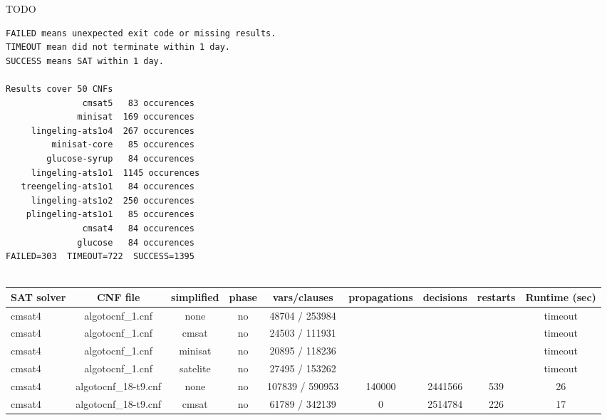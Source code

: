\begin{appendices}
TODO
\begin{verbatim}
FAILED means unexpected exit code or missing results.
TIMEOUT mean did not terminate within 1 day.
SUCCESS means SAT within 1 day.

Results cover 50 CNFs
               cmsat5   83 occurences
              minisat  169 occurences
     lingeling-ats1o4  267 occurences
         minisat-core   85 occurences
        glucose-syrup   84 occurences
     lingeling-ats1o1  1145 occurences
   treengeling-ats1o1   84 occurences
     lingeling-ats1o2  250 occurences
    plingeling-ats1o1   85 occurences
               cmsat4   84 occurences
              glucose   84 occurences
FAILED=303  TIMEOUT=722  SUCCESS=1395


\end{verbatim}
\tiny{
\begin{table}[p]
  \begin{center}
    \begin{tabular}{l|cccccccc}
        \textbf{SAT solver} & \textbf{CNF file} & \textbf{simplified} & \textbf{phase} & \textbf{vars/clauses} & \textbf{propagations} & \textbf{decisions} & \textbf{restarts} & \textbf{Runtime (sec)} \\
      \hline
  cmsat4                         & algotocnf\_1.cnf               & none       & no    & 48704 / 253984 &           &           &            & timeout \\ %
  cmsat4                         & algotocnf\_1.cnf               & cmsat      & no    & 24503 / 111931 &           &           &            & timeout \\ %
  cmsat4                         & algotocnf\_1.cnf               & minisat    & no    & 20895 / 118236 &           &           &            & timeout \\ %
  cmsat4                         & algotocnf\_1.cnf               & satelite   & no    & 27495 / 153262 &           &           &            & timeout \\ %
  cmsat4                         & algotocnf\_18-t9.cnf           & none       & no    & 107839 / 590953 & 140000    & 2441566   & 539        & 26 \\ %
  cmsat4                         & algotocnf\_18-t9.cnf           & cmsat      & no    & 61789 / 342139 & 0         & 2514784   & 226        & 17 \\ %

\end{tabular}
\end{center}
\end{table}}
\end{appendices}
